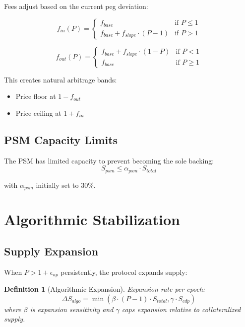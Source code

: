 \documentclass[11pt,a4paper]{article}
\newtheorem{definition}[theorem]{Definition}
\begin{document}
Fees adjust based on the current peg deviation:

\begin{equation}
    f_{in}(P) = \begin{cases}
        f_{base} & \text{if } P \leq 1 \\
        f_{base} + f_{slope} \cdot (P - 1) & \text{if } P > 1
    \end{cases}
\end{equation}

\begin{equation}
    f_{out}(P) = \begin{cases}
        f_{base} + f_{slope} \cdot (1 - P) & \text{if } P < 1 \\
        f_{base} & \text{if } P \geq 1
    \end{cases}
\end{equation}

This creates natural arbitrage bands:
\begin{itemize}
    \item Price floor at $1 - f_{out}$
    \item Price ceiling at $1 + f_{in}$
\end{itemize}

\subsection{PSM Capacity Limits}

The PSM has limited capacity to prevent becoming the sole backing:
\begin{equation}
    S_{psm} \leq \alpha_{psm} \cdot S_{total}
\end{equation}

with $\alpha_{psm}$ initially set to 30\%.

\section{Algorithmic Stabilization}

\subsection{Supply Expansion}

When $P > 1 + \epsilon_{up}$ persistently, the protocol expands supply:

\begin{definition}[Algorithmic Expansion]
Expansion rate per epoch:
\begin{equation}
    \Delta S_{algo} = \min\left(\beta \cdot (P - 1) \cdot S_{total}, \gamma \cdot S_{cdp}\right)
\end{equation}
where $\beta$ is expansion sensitivity and $\gamma$ caps expansion relative to collateralized supply.
\end{definition}
\end{document}
